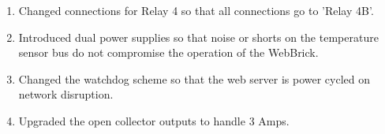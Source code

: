 \begin{enumerate}
\item
Changed connections for Relay 4 so that all connections go to 'Relay 4B'.

\item
Introduced dual power supplies so that noise or shorts on the temperature sensor bus do not compromise the operation of the WebBrick.

\item
Changed the watchdog scheme so that the web server is power cycled on network disruption.

\item Upgraded the open collector outputs to handle 3 Amps.


\end{enumerate}

